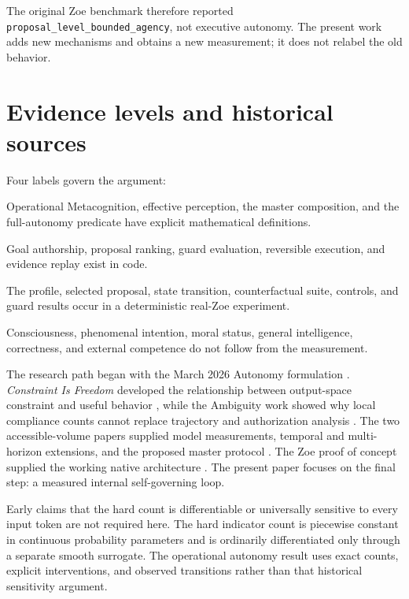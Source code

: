 \documentclass[11pt,a4paper]{article}
\begin{document}
The original Zoe benchmark therefore reported \texttt{proposal\_level\_bounded\_agency}, not executive autonomy. The present work adds new mechanisms and obtains a new measurement; it does not relabel the old behavior.

\section{Evidence levels and historical sources}
Four labels govern the argument:
\begin{description}[style=nextline]
  \item[Defined.] Operational Metacognition, effective perception, the master composition, and the full-autonomy predicate have explicit mathematical definitions.
  \item[Implemented.] Goal authorship, proposal ranking, guard evaluation, reversible execution, and evidence replay exist in code.
  \item[Measured.] The profile, selected proposal, state transition, counterfactual suite, controls, and guard results occur in a deterministic real-Zoe experiment.
  \item[Not inferred.] Consciousness, phenomenal intention, moral status, general intelligence, correctness, and external competence do not follow from the measurement.
\end{description}

The research path began with the March 2026 Autonomy formulation \cite{kloster2026autonomy}. \emph{Constraint Is Freedom} developed the relationship between output-space constraint and useful behavior \cite{nuclide2026constraint}, while the Ambiguity work showed why local compliance counts cannot replace trajectory and authorization analysis \cite{kloster2026ambiguity}. The two accessible-volume papers supplied model measurements, temporal and multi-horizon extensions, and the proposed master protocol \cite{kloster2026significance,kloster2026beyond}. The Zoe proof of concept supplied the working native architecture \cite{zoe2026}. The present paper focuses on the final step: a measured internal self-governing loop.

Early claims that the hard count is differentiable or universally sensitive to every input token are not required here. The hard indicator count is piecewise constant in continuous probability parameters and is ordinarily differentiated only through a separate smooth surrogate. The operational autonomy result uses exact counts, explicit interventions, and observed transitions rather than that historical sensitivity argument.
\end{document}
